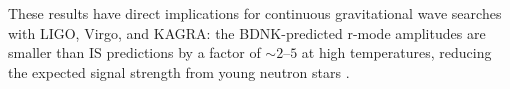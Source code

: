 These results have direct implications for continuous gravitational wave
searches with LIGO, Virgo, and KAGRA: the BDNK-predicted r-mode
amplitudes are smaller than IS predictions by a factor of $\sim 2$--$5$
at high temperatures, reducing the expected signal strength from young
neutron stars \cite{Lasky2015,DR11_Abbott2017GW170817}.
